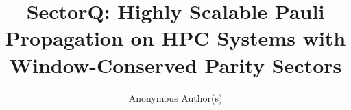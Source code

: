 \documentclass[acmsmall,screen,nonacm,review]{acmart}
\begin{document}
\title{SectorQ: Highly Scalable Pauli Propagation on HPC Systems with Window-Conserved Parity Sectors}

\author{Anonymous Author(s)}

\begin{abstract}

\end{abstract}

\maketitle










\end{document}
